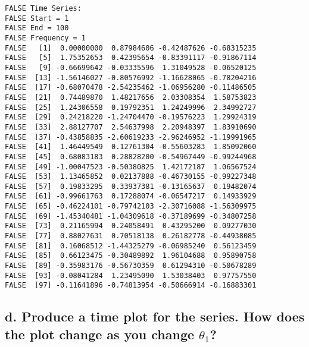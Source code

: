 \documentclass[openany]{book}
\begin{document}
\begin{verbatim}
FALSE Time Series:
FALSE Start = 1 
FALSE End = 100 
FALSE Frequency = 1 
FALSE   [1]  0.00000000  0.87984606 -0.42487626 -0.68315235
FALSE   [5]  1.75352653  0.42395654 -0.83391117 -0.91867114
FALSE   [9] -0.66699642 -0.03335596  1.31049528 -0.06520125
FALSE  [13] -1.56146027 -0.80576992 -1.16628065 -0.78204216
FALSE  [17] -0.68070478 -2.54235462 -1.06956280 -0.11486505
FALSE  [21]  0.74489870  1.48217656  2.03308354  1.58753823
FALSE  [25]  1.24306558  0.19792351  1.24249996  2.34992727
FALSE  [29]  0.24218220 -1.24704470 -0.19576223  1.29924319
FALSE  [33]  2.88127707  2.54637998  2.20948397  1.83910690
FALSE  [37] -0.43858835 -2.60619233 -2.96246952 -1.19991965
FALSE  [41]  1.46449549  0.12761304 -0.55603283  1.85092060
FALSE  [45]  0.68083183  0.28828200 -0.54967449 -0.99244968
FALSE  [49] -1.00047523 -0.50380825  1.42172187  1.06567524
FALSE  [53]  1.13465852  0.02137888 -0.46730155 -0.99227348
FALSE  [57]  0.19833295  0.33937381 -0.13165637  0.19482074
FALSE  [61] -0.99661763  0.17288074 -0.06547217  0.14933929
FALSE  [65] -0.46224101 -0.79742103 -2.30716088 -1.56309975
FALSE  [69] -1.45340481 -1.04309618 -0.37189699 -0.34807258
FALSE  [73]  0.21165994  0.24058491  0.43295200  0.09277030
FALSE  [77]  0.88027631  0.70518138  0.26182778 -0.44938085
FALSE  [81]  0.16068512 -1.44325279 -0.06985240  0.56123459
FALSE  [85]  0.66123475 -0.30489892  1.96104688  0.95890758
FALSE  [89] -0.35983176 -0.56730359  0.61294310 -0.50678289
FALSE  [93] -0.08041284  1.23495090  1.53038403  0.97757550
FALSE  [97] -0.11641896 -0.74813954 -0.50666914 -0.16883301
\end{verbatim}

\hypertarget{d.-produce-a-time-plot-for-the-series.-how-does-the-plot-change-as-you-change-theta_1}{%
\subsection{\texorpdfstring{d. Produce a time plot for the series. How does the plot change as you change \(\theta_1\)?}{d. Produce a time plot for the series. How does the plot change as you change \textbackslash{}theta\_1?}}\label{d.-produce-a-time-plot-for-the-series.-how-does-the-plot-change-as-you-change-theta_1}}
\end{document}
